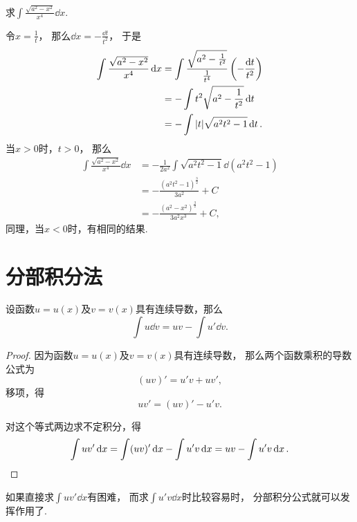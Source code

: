 \begin{example}
求\(\int \frac{\sqrt{a^2 - x^2}}{x^4} \dd{x}\).
\begin{solution}
令\(x = \frac{1}{t}\)，
那么\(\dd{x} = -\frac{\dd{t}}{t^2}\)，
于是\begin{align*}
	\int \frac{\sqrt{a^2 - x^2}}{x^4} \dd{x}
	&= \int \frac{\sqrt{a^2 - \frac{1}{t^2}}}{\frac{1}{t^4}}
		\left( -\frac{\dd{t}}{t^2} \right) \\
	&= -\int t^2 \sqrt{a^2 - \frac{1}{t^2}} \dd{t} \\
	&= -\int \abs{t} \sqrt{a^2 t^2 - 1} \dd{t}.
\end{align*}
当\(x > 0\)时，\(t > 0\)，
那么\begin{align*}
	\int \frac{\sqrt{a^2 - x^2}}{x^4} \dd{x}
	&= -\frac{1}{2a^2} \int \sqrt{a^2 t^2 - 1} \dd(a^2 t^2 - 1) \\
	&= -\frac{(a^2 t^2 - 1)^{\frac32}}{3 a^2} + C \\
	&= -\frac{(a^2 - x^2)^{\frac32}}{3 a^2 x^3} + C,
\end{align*}
同理，当\(x < 0\)时，有相同的结果.
\end{solution}
\end{example}

\section{分部积分法}
\begin{theorem}[分部积分公式]
设函数\(u=u(x)\)及\(v=v(x)\)具有连续导数，那么\[
	\int u \dd{v} = uv - \int u' \dd{v}.
\]
\begin{proof}
因为函数\(u=u(x)\)及\(v=v(x)\)具有连续导数，
那么两个函数乘积的导数公式为\[
	(uv)' = u'v + uv',
\]
移项，得\[
	uv' = (uv)' - u'v.
\]

对这个等式两边求不定积分，得\[
	\int u v' \dd{x} = \int (uv)' \dd{x} - \int u' v \dd{x}
	= uv - \int u' v \dd{x}.
	\qedhere
\]
\end{proof}
\end{theorem}
如果直接求\(\int u v' \dd{x}\)有困难，
而求\(\int u' v \dd{x}\)时比较容易时，
分部积分公式就可以发挥作用了.

